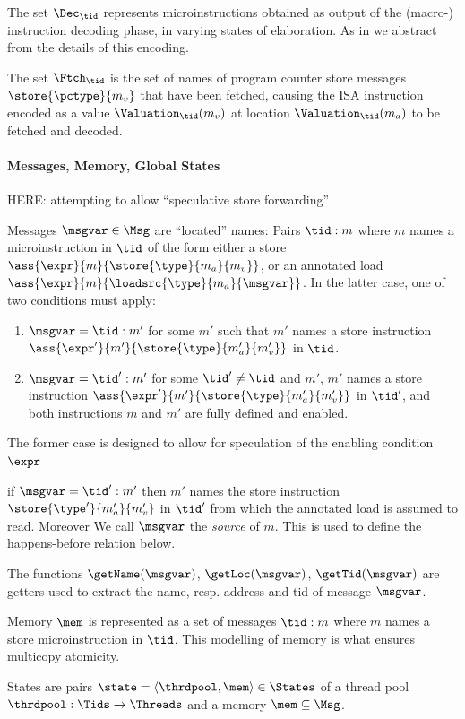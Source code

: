 The set $\Dec_\tid$ represents microinstructions obtained as output of the (macro-) instruction decoding phase, in varying states of elaboration. As in \cite{MIL} we abstract from the details of this encoding.

The set $\Ftch_\tid$ is the set of names of program counter store messages $\store{\pctype}{m_v}$ that have been fetched, causing the ISA instruction encoded as a value $\Valuation_\tid(m_v)$ at location $\Valuation_\tid(m_a)$ to be fetched and decoded.

\paragraph{Messages, Memory, Global States}
%
HERE: attempting to allow ``speculative store forwarding''

Messages $\msgvar\in\Msg$ are ``located'' names: Pairs $\tid:m$ where $m$ names a microinstruction in $\tid$ of the form either a store $\ass{\expr}{m}{\store{\type}{m_a}{m_v}}$, or an annotated load
$\ass{\expr}{m}{\loadsrc{\type}{m_a}{\msgvar}}$. In the latter case, one of two conditions must apply:
%
\begin{enumerate}
\item $\msgvar=\tid:m'$ for some $m'$ such that $m'$ names a store instruction
$\ass{\expr'}{m'}{\store{\type}{m_a'}{m_v'}}$ in $\tid$.
\item $\msgvar = \tid':m'$ for some $\tid'\neq\tid$ and $m'$,
$m'$ names a store instruction
$\ass{\expr'}{m'}{\store{\type}{m_a'}{m_v'}}$ in $\tid'$, and both instructions $m$ and $m'$ are fully defined and enabled.
\end{enumerate}
%
The former case is designed to allow for speculation of the enabling condition $\expr$

if $\msgvar = \tid':m'$ then $m'$ names the store instruction $\store{\type'}{m_a'}{m_v'}$ in $\tid'$ from which the annotated load is assumed to read. Moreover
We call $\msgvar$ the \emph{source} of $m$. This is used to define the happens-before relation below.

The functions $\getName(\msgvar)$, $\getLoc(\msgvar)$, $\getTid(\msgvar)$ are getters used to extract the name, resp. address and tid of message $\msgvar$.

Memory $\mem$ is represented as a set of messages $\tid:m$ where $m$ names a
store microinstruction in $\tid$. This modelling of memory is what ensures multicopy atomicity.

States are pairs $\state = \langle \thrdpool,\mem \rangle\in\States$ of a thread pool $\thrdpool : \Tids\rightarrow \Threads$ and a memory $\mem\subseteq\Msg$.

